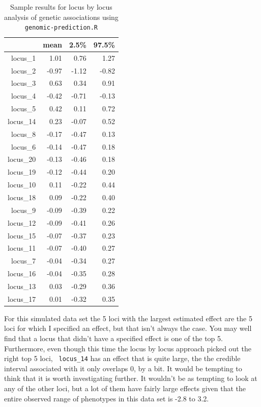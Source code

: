 \begin{table}[ht]
\centering
\begin{tabular}{rrrr}
  \hline
 & mean & 2.5\% & 97.5\% \\ 
  \hline
locus\_1 & 1.01 & 0.76 & 1.27 \\ 
  locus\_2 & -0.97 & -1.12 & -0.82 \\ 
  locus\_3 & 0.63 & 0.34 & 0.91 \\ 
  locus\_4 & -0.42 & -0.71 & -0.13 \\ 
  locus\_5 & 0.42 & 0.11 & 0.72 \\ 
  locus\_14 & 0.23 & -0.07 & 0.52 \\ 
  locus\_8 & -0.17 & -0.47 & 0.13 \\ 
  locus\_6 & -0.14 & -0.47 & 0.18 \\ 
  locus\_20 & -0.13 & -0.46 & 0.18 \\ 
  locus\_19 & -0.12 & -0.44 & 0.20 \\ 
  locus\_10 & 0.11 & -0.22 & 0.44 \\ 
  locus\_18 & 0.09 & -0.22 & 0.40 \\ 
  locus\_9 & -0.09 & -0.39 & 0.22 \\ 
  locus\_12 & -0.09 & -0.41 & 0.26 \\ 
  locus\_15 & -0.07 & -0.37 & 0.23 \\ 
  locus\_11 & -0.07 & -0.40 & 0.27 \\ 
  locus\_7 & -0.04 & -0.34 & 0.27 \\ 
  locus\_16 & -0.04 & -0.35 & 0.28 \\ 
  locus\_13 & 0.03 & -0.29 & 0.36 \\ 
  locus\_17 & 0.01 & -0.32 & 0.35 \\ 
   \hline
\end{tabular}
\caption{Sample results for locus by locus analysis of genetic
  associations using {\tt genomic-prediction.R}}\label{table:single}
\end{table}

For this simulated data set the 5 loci with the largest estimated
effect are the 5 loci for which I specified an effect, but that isn't
always the case. You may well find that a locus that didn't have a
specified effect is one of the top 5. Furthermore, even though this
time the locus by locus approach picked out the right top 5 loci, {\tt
  locus\_14} has an effect that is quite large, the the credible
interval associated with it only overlaps 0, by a bit. It would be
tempting to think that it is worth investigating further. It wouldn't
be as tempting to look at any of the other loci, but a lot of them
have fairly large effects given that the entire observed range of
phenotypes in this data set is -2.8 to 3.2.

